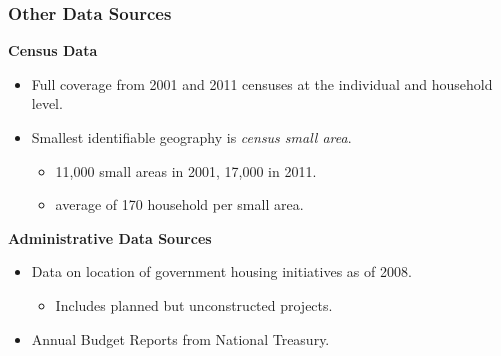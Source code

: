 \documentclass[aspectratio=149]{beamer}
\begin{document}
\begin{frame}
\frametitle{Other Data Sources}



 {\bf Census Data} 



  \begin{itemize}
    \item Full coverage from 2001 and 2011 censuses at the individual and household level.

    \item Smallest identifiable geography is {\it census small area}.
    \begin{itemize}
    \item 11,000 small areas in 2001, 17,000 in 2011.
    \item average of 170 household per small area.
    \end{itemize}
  \end{itemize}

  \vspace{2mm}

  {\bf Administrative Data Sources} 



  \begin{itemize}
    \item Data on location of government housing initiatives as of 2008.
    \begin{itemize} 
      \item Includes planned but unconstructed projects.
    \end{itemize}

    \item Annual Budget Reports from National Treasury. 
    
  \end{itemize}

\end{frame}

\end{document}
